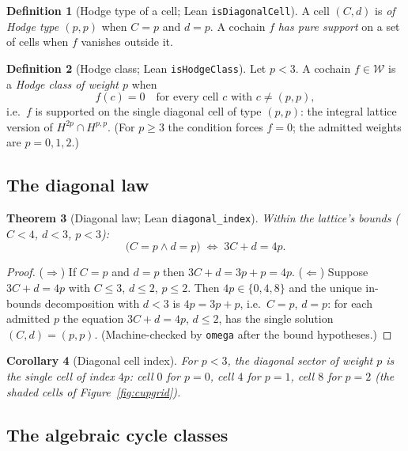 \documentclass[11pt,a4paper]{article}
\theoremstyle{plain}
\newtheorem{theorem}{Theorem}[section]
\newtheorem{corollary}[theorem]{Corollary}
\theoremstyle{definition}
\newtheorem{definition}[theorem]{Definition}
\begin{document}
\begin{definition}[Hodge type of a cell; Lean \texttt{isDiagonalCell}]
A cell $(C,d)$ is \emph{of Hodge type $(p,p)$} when $C = p$ and $d = p$.
A cochain $f$ \emph{has pure support} on a set of cells when $f$ vanishes
outside it.
\end{definition}

\begin{definition}[Hodge class; Lean \texttt{isHodgeClass}]\label{def:hodgeclass}
Let $p < 3$. A cochain $f \in \mathcal{W}$ is a \emph{Hodge class of weight
$p$} when
\[
  f(c) = 0 \quad\text{for every cell } c \text{ with } c \neq (p,p),
\]
i.e.\ $f$ is supported on the single diagonal cell of type $(p,p)$: the
integral lattice version of $H^{2p}\cap H^{p,p}$. (For $p \ge 3$ the
condition forces $f = 0$; the admitted weights are $p = 0,1,2$.)
\end{definition}

\subsection{The diagonal law}

\begin{theorem}[Diagonal law; Lean \texttt{diagonal\_index}]
\label{thm:diagonal}
Within the lattice's bounds ($C<4$, $d<3$, $p<3$):
\[
  \bigl(C = p \wedge d = p\bigr) \;\iff\; 3C + d = 4p.
\]
\end{theorem}

\begin{proof}
($\Rightarrow$) If $C=p$ and $d=p$ then $3C+d = 3p+p = 4p$.
($\Leftarrow$) Suppose $3C+d = 4p$ with $C \le 3$, $d \le 2$, $p \le 2$.
Then $4p \in \{0,4,8\}$ and the unique in-bounds decomposition with $d<3$ is
$4p = 3p + p$, i.e.\ $C = p$, $d = p$: for each admitted $p$ the equation
$3C + d = 4p$, $d \le 2$, has the single solution $(C,d) = (p,p)$.
(Machine-checked by \texttt{omega} after the bound hypotheses.)
\end{proof}

\begin{corollary}[Diagonal cell index]\label{cor:diagcell}
For $p<3$, the diagonal sector of weight $p$ is the single cell of index
$4p$: cell $0$ for $p=0$, cell $4$ for $p=1$, cell $8$ for $p=2$
(the shaded cells of Figure~\ref{fig:cupgrid}).
\end{corollary}

\subsection{The algebraic cycle classes}
\end{document}
